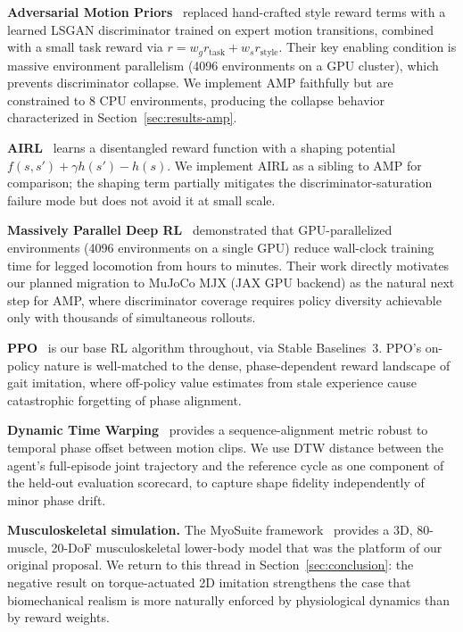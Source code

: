 \documentclass{article}
\begin{document}
\textbf{Adversarial Motion Priors}~\cite{escontrela2022amp} replaced hand-crafted style reward terms with a learned LSGAN discriminator trained on expert motion transitions, combined with a small task reward via $r = w_g r_{\text{task}} + w_s r_{\text{style}}$. Their key enabling condition is massive environment parallelism (4096 environments on a GPU cluster), which prevents discriminator collapse. We implement AMP faithfully but are constrained to 8 CPU environments, producing the collapse behavior characterized in Section~\ref{sec:results-amp}.

\textbf{AIRL}~\cite{fu2018airl} learns a disentangled reward function with a shaping potential $f(s,s') + \gamma h(s') - h(s)$. We implement AIRL as a sibling to AMP for comparison; the shaping term partially mitigates the discriminator-saturation failure mode but does not avoid it at small scale.

\textbf{Massively Parallel Deep RL}~\cite{rudin2022walk} demonstrated that GPU-parallelized environments (4096 environments on a single GPU) reduce wall-clock training time for legged locomotion from hours to minutes. Their work directly motivates our planned migration to MuJoCo MJX (JAX GPU backend) as the natural next step for AMP, where discriminator coverage requires policy diversity achievable only with thousands of simultaneous rollouts.

\textbf{PPO}~\cite{schulman2017ppo} is our base RL algorithm throughout, via Stable Baselines~3. PPO's on-policy nature is well-matched to the dense, phase-dependent reward landscape of gait imitation, where off-policy value estimates from stale experience cause catastrophic forgetting of phase alignment.

\textbf{Dynamic Time Warping}~\cite{kovar2002motiongraphs} provides a sequence-alignment metric robust to temporal phase offset between motion clips. We use DTW distance between the agent's full-episode joint trajectory and the reference cycle as one component of the held-out evaluation scorecard, to capture shape fidelity independently of minor phase drift.

\textbf{Musculoskeletal simulation.} The MyoSuite framework~\cite{caggiano2022myosuite} provides a 3D, 80-muscle, 20-DoF musculoskeletal lower-body model that was the platform of our original proposal. We return to this thread in Section~\ref{sec:conclusion}: the negative result on torque-actuated 2D imitation strengthens the case that biomechanical realism is more naturally enforced by physiological dynamics than by reward weights.
\end{document}

